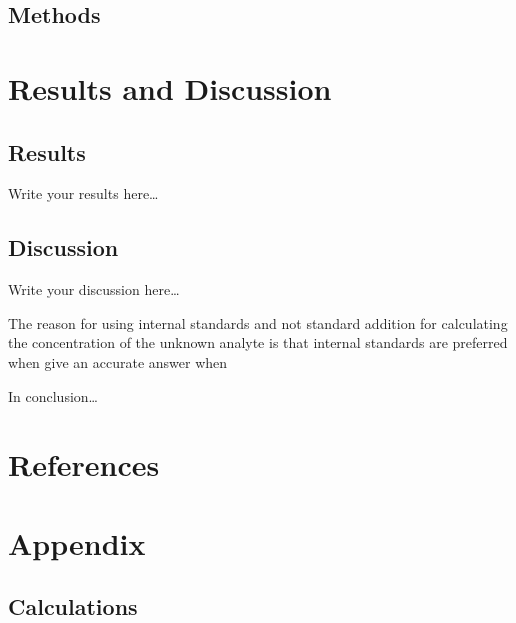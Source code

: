 \documentclass[a4paper, 12pt]{article}
\begin{document}
\subsection{Methods}



\section{Results and Discussion}

\subsection{Results}
Write your results here\ldots


\subsection{Discussion}
Write your discussion here\dots

The reason for using internal standards and not standard addition for calculating the concentration of the unknown analyte is that internal standards are preferred when give an accurate answer when 

In conclusion\dots


\section{References}
\printbibliography


\section{Appendix}

\subsection{Calculations}
\end{document}
